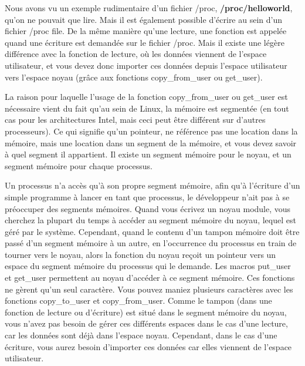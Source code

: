\documentclass[11pt]{article}
\begin{document}
Nous avons vu un exemple rudimentaire d'un fichier /proc, \textbf{/proc/helloworld}, qu'on ne pouvait que lire. Mais il est également possible d'écrire au sein d'un fichier /proc file. De la même manière qu'une lecture, une fonction est appelée quand une écriture est demandée sur le fichier /proc. Mais il existe une légère différence avec la fonction de lecture, où les données viennent de l'espace utilisateur, et vous devez donc importer ces données depuis l'espace utilisateur vers l'espace noyau (grâce aux fonctions copy\_from\_user ou get\_user).

La raison pour laquelle l'usage de la fonction copy\_from\_user ou get\_user est nécessaire vient du fait qu'au sein de Linux, la mémoire est segmentée (en tout cas pour les architectures Intel, mais ceci peut être différent sur d'autres processeurs). Ce qui signifie qu'un pointeur, ne référence pas une location dans la mémoire, mais une location dans un segment de la mémoire, et vous devez savoir à quel segment il appartient. Il existe un segment mémoire pour le noyau, et un segment mémoire pour chaque processus.

Un processus n'a accès qu'à son propre segment mémoire, afin qu'à l'écriture d'un simple programme à lancer en tant que processus, le développeur n'ait pas à se préoccuper des segments mémoires. Quand vous écrivez un noyau module, vous cherchez la plupart du temps à accéder au segment mémoire du noyau, lequel est géré par le système. Cependant, quand le contenu d'un tampon mémoire doit être passé d'un segment mémoire à un autre, en l'occurrence du processus en train de tourner vers le noyau, alors la fonction du noyau reçoit un pointeur vers un espace du segment mémoire du processus qui le demande. Les macros put\_user et get\_user permettent au noyau d'accéder à ce segment mémoire. Ces fonctions ne gèrent qu'un seul caractère. Vous pouvez maniez plusieurs caractères avec les fonctions copy\_to\_user et copy\_from\_user. Comme le tampon (dans une fonction de lecture ou d'écriture) est situé dans le segment mémoire du noyau, vous n'avez pas besoin de gérer ces différents espaces dans le cas d'une lecture, car les données sont déjà dans l'espace noyau. Cependant, dans le cas d'une écriture, vous aurez besoin d'importer ces données car elles viennent de l'espace utilisateur.
\end{document}
